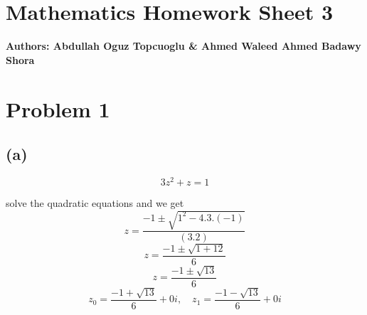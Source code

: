 \documentclass{article}
\begin{document}
\section*{\huge Mathematics Homework Sheet 3}
\begin{flushright}
   \textbf{Authors: Abdullah Oguz Topcuoglu \& Ahmed Waleed Ahmed Badawy Shora}
\end{flushright}


\section*{Problem 1}


\subsection*{(a)}
\[
   3z^2 + z = 1
\]

solve the quadratic equations and we get
\[
   z = \frac{-1 \pm \sqrt{1^2 - 4.3.(-1)}}{(3.2)}
\]
\[
   z = \frac{-1 \pm \sqrt{1 + 12}}{6}
\]
\[
   z = \frac{-1 \pm \sqrt{13}}{6}
\]
\[
   z_0 = \frac{-1 + \sqrt{13}}{6} + 0i, \quad z_1 = \frac{-1 - \sqrt{13}}{6} + 0i
\]
\end{document}
